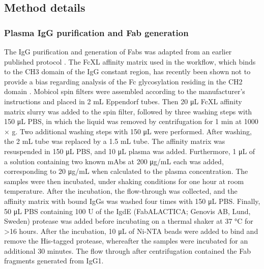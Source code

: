 \subsection{Method details}

\subsubsection{Plasma IgG purification and Fab generation}
The IgG purification and generation of Fabs was adapted from an earlier published protocol \cite{bondt2014immunoglobulin}. The FcXL affinity matrix used in the workflow, which binds to the CH3 domain of the IgG constant region, has recently been shown not to provide a bias regarding analysis of the Fc glycosylation residing in the CH2 domain \cite{amezmartín2021serum}. Mobicol spin filters were assembled according to the manufacturer’s instructions and placed in 2 mL Eppendorf tubes. Then 20 μL FcXL affinity matrix slurry was added to the spin filter, followed by three washing steps with 150 μL PBS, in which the liquid was removed by centrifugation for 1 min at 1000 × g. Two additional washing steps with 150 μL were performed. After washing, the 2 mL tube was replaced by a 1.5 mL tube. The affinity matrix was resuspended in 150 μL PBS, and 10 μL plasma was added. Furthermore, 1 μL of a solution containing two known mAbs at 200 μg/mL each was added, corresponding to 20 μg/mL when calculated to the plasma concentration. The samples were then incubated, under shaking conditions for one hour at room temperature. After the incubation, the flow-through was collected, and the affinity matrix with bound IgGs was washed four times with 150 μL PBS. Finally, 50 μL PBS containing 100 U of the IgdE (FabALACTICA; Genovis AB, Lund, Sweden) protease was added before incubating on a thermal shaker at 37 °C for >16 hours. After the incubation, 10 μL of Ni-NTA beads were added to bind and remove the His-tagged protease, whereafter the samples were incubated for an additional 30 minutes. The flow through after centrifugation contained the Fab fragments generated from IgG1.

